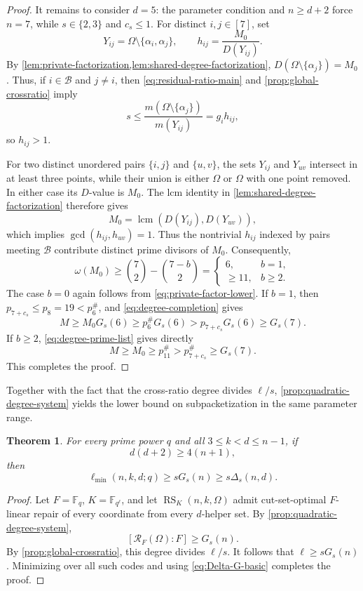 \documentclass[11pt,onecolumn]{IEEEtran}
\newtheorem{theorem}{Theorem}
\newcommand{\F}{\mathbb{F}}
\newcommand{\lcmop}{\operatorname{lcm}}
\newcommand{\RS}{\operatorname{RS}}
\newcommand{\crf}{\mathscr R}
\newcommand{\ellmin}{\ell_{\min}}
\newcommand{\primorial}[1]{p_{#1}^{\#}}
\begin{document}
\begin{proof}
It remains to consider $d=5$: the parameter condition and
$n\ge d+2$ force $n=7$, while $s\in\{2,3\}$ and $c_s\le1$.
For distinct $i,j\in[7]$, set
\[
Y_{ij}=\Omega\setminus\{\alpha_i,\alpha_j\},\qquad
h_{ij}=\frac{M_0}{D(Y_{ij})}.
\]
By \cref{lem:private-factorization,lem:shared-degree-factorization},
$D(\Omega\setminus\{\alpha_j\})=M_0$.
Thus, if $i\in\mathcal B$ and $j\ne i$, then
\eqref{eq:residual-ratio-main} and \cref{prop:global-crossratio}
imply
\[
s\le\frac{m(\Omega\setminus\{\alpha_j\})}{m(Y_{ij})}
=g_i h_{ij},
\]
so $h_{ij}>1$.

For two distinct unordered pairs $\{i,j\}$ and $\{u,v\}$,
the sets $Y_{ij}$ and $Y_{uv}$ intersect in at least three
points, while their union is either $\Omega$ or $\Omega$ with one
point removed. In either case its $D$-value is
$M_0$. The lcm identity in
\cref{lem:shared-degree-factorization} therefore gives
\[
M_0
=\lcmop(D(Y_{ij}),D(Y_{uv})),
\]
which implies $\gcd(h_{ij},h_{uv})=1$.
Thus the nontrivial $h_{ij}$ indexed by pairs meeting
$\mathcal B$ contribute distinct prime divisors of $M_0$.
Consequently,
\[
\omega(M_0)
\ge \binom72-\binom{7-b}{2}
=\begin{cases}
6,&b=1,\\
\ge11,&b\ge2.
\end{cases}
\]
The case $b=0$ again follows from \eqref{eq:private-factor-lower}.
If $b=1$, then $p_{7+c_s}\le p_8=19<\primorial{6}$, and
\eqref{eq:degree-completion} gives
\[
M\ge M_0G_s(6)
\ge\primorial{6}G_s(6)
>p_{7+c_s}G_s(6)\ge G_s(7).
\]
If $b\ge2$, \eqref{eq:degree-prime-list} gives directly
\[
M\ge M_0\ge\primorial{11}
>\primorial{7+c_s}\ge G_s(7).
\]
This completes the proof.
\end{proof}

Together with the fact that the cross-ratio degree divides $\ell/s$,
\cref{prop:quadratic-degree-system} yields the lower bound on
subpacketization in the same parameter range.

\begin{theorem}
\label{thm:quadratic-global-lower}
For every prime power $q$ and all $3\le k<d\le n-1$, if
\[
d(d+2)\geq 4(n+1),
\]
then
\[
\ellmin(n,k,d;q)\ge sG_s(n)\ge s\Delta_s(n,d).
\]
\end{theorem}

\begin{proof}
Let $F=\F_q$, $K=\F_{q^\ell}$, and let $\RS_K(n,k,\Omega)$ admit cut-set-optimal $F$-linear
repair of every coordinate from every $d$-helper set.
By \cref{prop:quadratic-degree-system},
\[
[\crf_F(\Omega):F]\ge G_s(n).
\]
By \cref{prop:global-crossratio}, this degree divides $\ell/s$.
It follows that $\ell\ge sG_s(n)$. Minimizing over all such codes
and using \eqref{eq:Delta-G-basic} completes the proof.
\end{proof}
\end{document}

